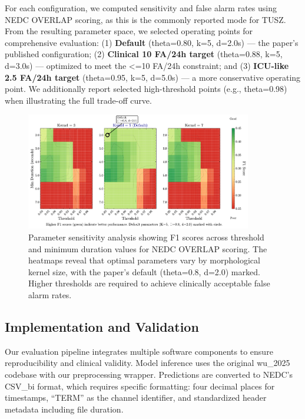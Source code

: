 \documentclass[
]{article}
\begin{document}
For each configuration, we computed sensitivity and false alarm rates
using NEDC OVERLAP scoring, as this is the commonly reported mode for
TUSZ. From the resulting parameter space, we selected operating points
for comprehensive evaluation: (1) \textbf{Default} (theta=0.80, k=5,
d=2.0s) --- the paper's published configuration; (2) \textbf{Clinical 10
FA/24h target} (theta=0.88, k=5, d=3.0s) --- optimized to meet the
\textless=10 FA/24h constraint; and (3) \textbf{ICU-like 2.5 FA/24h
target} (theta=0.95, k=5, d=5.0s) --- a more conservative operating
point. We additionally report selected high-threshold points (e.g.,
theta=0.98) when illustrating the full trade-off curve.

\begin{figure}
\hypertarget{fig:parameter-heatmap}{%
\centering
\includegraphics[width=0.88\textwidth,height=\textheight]{figures/output/arxiv/FIGURE_3_parameter_heatmap.pdf}
\caption{Parameter sensitivity analysis showing F1 scores across
threshold and minimum duration values for NEDC OVERLAP scoring. The
heatmaps reveal that optimal parameters vary by morphological kernel
size, with the paper's default (theta=0.8, d=2.0) marked. Higher
thresholds are required to achieve clinically acceptable false alarm
rates.}\label{fig:parameter-heatmap}
}
\end{figure}

\hypertarget{implementation-and-validation}{%
\subsection{Implementation and
Validation}\label{implementation-and-validation}}

Our evaluation pipeline integrates multiple software components to
ensure reproducibility and clinical validity. Model inference uses the
original wu\_2025 codebase with our preprocessing wrapper. Predictions
are converted to NEDC's CSV\_bi format, which requires specific
formatting: four decimal places for timestamps, ``TERM'' as the channel
identifier, and standardized header metadata including file duration.
\end{document}

